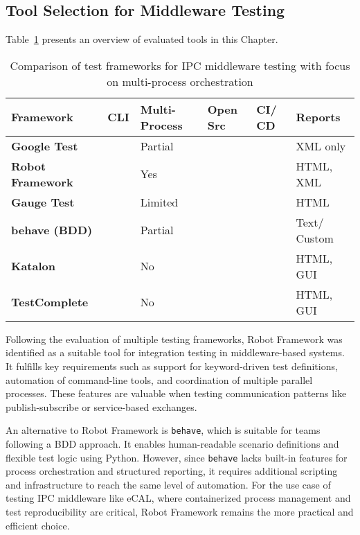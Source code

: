 \newpage
\subsection{Tool Selection for Middleware Testing}

\vspace{0em}
Table~\ref{tab:framework_comparison_reporting} presents an overview of evaluated tools in this Chapter.

\begin{table}[H]
	\centering
	\renewcommand{\arraystretch}{1.4}
	\begin{tabular}{|p{2.8cm}|p{1cm}|p{1.7cm}|p{1cm}|p{1cm}|p{1.7cm}|}
		\hline
		\textbf{Framework} & \textbf{CLI} & \textbf{Multi- Process} & \textbf{Open Src} & \textbf{CI/ CD} & \textbf{Reports} \\
		\hline
		\textbf{Google Test}         & \cmark & Partial     & \cmark & \cmark & XML only \\
		\hline
		\textbf{Robot Framework}     & \cmark & Yes & \cmark & \cmark & HTML, XML \\
		\hline
		\textbf{Gauge Test}          & \cmark & Limited                       & \cmark & \cmark & HTML \\
		\hline
		\textbf{behave (BDD)}        & \cmark & Partial	   & \cmark & \cmark & Text/ Custom \\
		\hline
		\textbf{Katalon}             & \xmark & No                           & \xmark & \xmark & HTML, GUI \\
		\hline
		\textbf{TestComplete}        & \xmark &  No                      & \xmark & \xmark & HTML, GUI \\
		\hline
	\end{tabular}
	\caption{Comparison of test frameworks for IPC middleware testing with focus on multi-process orchestration}
	\label{tab:framework_comparison_reporting}
\end{table}

Following the evaluation of multiple testing frameworks, Robot Framework was identified as a suitable tool for integration testing in middleware-based systems. It fulfills key requirements such as support for keyword-driven test definitions, automation of command-line tools, and coordination of multiple parallel processes. These features are valuable when testing communication patterns like publish-subscribe or service-based exchanges.

\vspace{1em}
An alternative to Robot Framework is \texttt{behave}, which is suitable for teams following a BDD approach. It enables human-readable scenario definitions and flexible test logic using Python. However, since \texttt{behave} lacks built-in features for process orchestration and structured reporting, it requires additional scripting and infrastructure to reach the same level of automation. For the use case of testing IPC middleware like eCAL, where containerized process management and test reproducibility are critical, Robot Framework remains the more practical and efficient choice.

